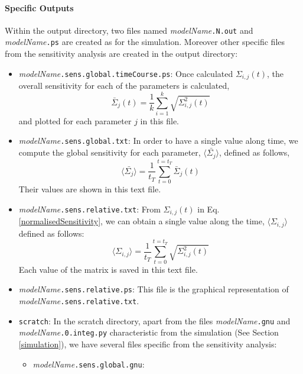 \documentclass[a4paper, 11pt]{article}
\begin{document}
\paragraph{Specific Outputs}
Within the output directory, two files named \textit{modelName}\texttt{.N.out} and \textit{modelName}\texttt{.ps} are created as for the simulation.
Moreover other specific files from the sensitivity analysis are created in the output directory:
\begin{itemize}
  \item \textit{modelName}\texttt{.sens.global.timeCourse.ps}:
    Once calculated $\Sigma_{i,j}(t)$, the overall sensitivity for each of the parameters is calculated,
    \begin{equation} \label{overallSensitivity}
      \bar{\Sigma}_{j}(t) = \frac{1}{k}\sum_{i=1}^{k}\sqrt{\Sigma_{i,j}^{2}(t)}
    \end{equation}
    and plotted for each parameter $j$ in this file.
  \item \textit{modelName}\texttt{.sens.global.txt}: 
    In order to have a single value along time, we compute the global sensitivity for each parameter, $\langle \bar{\Sigma_j} \rangle$, defined as follows, 
    \begin{equation}
      \langle \bar{\Sigma_j} \rangle = \frac{1}{t_T}\sum_{t=0}^{t=t_T}\bar{\Sigma}_{j}(t)
    \end{equation}
    Their values are shown in this text file.
  \item \textit{modelName}\texttt{.sens.relative.txt}:
    From $\Sigma_{i,j}(t)$ in Eq. \ref{normalisedSensitivity}, we can obtain a single value along the time, $\langle \Sigma_{i,j} \rangle$ defined as follows:
    \begin{equation}
      \langle \Sigma_{i,j} \rangle = \frac{1}{t_T}\sum_{t=0}^{t=t_T}\sqrt{\Sigma_{i,j}^2(t)}
    \end{equation}
    Each value of the matrix is saved in this text file.
  \item \textit{modelName}\texttt{.sens.relative.ps}:
    This file is the graphical representation of \textit{modelName}\texttt{.sens.relative.txt}.
  \item \texttt{scratch}: 
    In the scratch directory, apart from the files \textit{modelName}\texttt{.gnu} and \textit{modelName}\texttt{.0.integ.py} characteristic from the simulation (See Section \ref{simulation}), we have several files specific from the sensitivity analysis:
    \begin{itemize}
      \item \textit{modelName}\texttt{.sens.global.gnu}:

\end{itemize}
\end{itemize}
\end{document}
